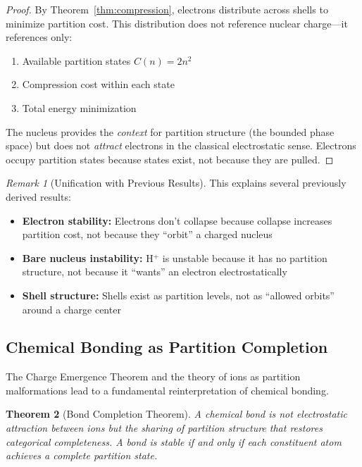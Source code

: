 \documentclass[twocolumn,10pt,a4paper]{article}
\newtheorem{theorem}{Theorem}[section]
\theoremstyle{definition}
\theoremstyle{remark}
\newtheorem{remark}[theorem]{Remark}
\begin{document}
\begin{proof}
By Theorem~\ref{thm:compression}, electrons distribute across shells to minimize partition cost. This distribution does not reference nuclear charge---it references only:
\begin{enumerate}
    \item Available partition states $C(n) = 2n^2$
    \item Compression cost within each state
    \item Total energy minimization
\end{enumerate}

The nucleus provides the \emph{context} for partition structure (the bounded phase space) but does not \emph{attract} electrons in the classical electrostatic sense. Electrons occupy partition states because states exist, not because they are pulled.
\end{proof}

\begin{remark}[Unification with Previous Results]
This explains several previously derived results:
\begin{itemize}
    \item \textbf{Electron stability:} Electrons don't collapse because collapse increases partition cost, not because they ``orbit'' a charged nucleus
    \item \textbf{Bare nucleus instability:} H$^+$ is unstable because it has no partition structure, not because it ``wants'' an electron electrostatically
    \item \textbf{Shell structure:} Shells exist as partition levels, not as ``allowed orbits'' around a charge center
\end{itemize}
\end{remark}

\subsection{Chemical Bonding as Partition Completion}

The Charge Emergence Theorem and the theory of ions as partition malformations lead to a fundamental reinterpretation of chemical bonding.

\begin{theorem}[Bond Completion Theorem]
\label{thm:bond_completion}
A chemical bond is not electrostatic attraction between ions but the sharing of partition structure that restores categorical completeness. A bond is stable if and only if each constituent atom achieves a complete partition state.
\end{theorem}
\end{document}
